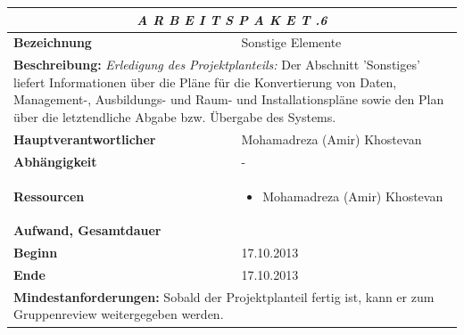 \documentclass[fontsize=12pt,paper=a4,twoside]{scrartcl}
\begin{document}
\begin{tabular}{p{7.5cm}|p{7.5cm}}\toprule
\multicolumn{2}{c}{\textbf{\textit{A R B E I T S P A K E T \quad 1.1.6}}} \\ \toprule \hline
\textbf{Bezeichnung} & Sonstige Elemente\\\hline
\multicolumn{2}{p{15cm}}{\textbf{Beschreibung:} \newline 
\textit{Erledigung des Projektplanteils:} Der Abschnitt 'Sonstiges' liefert Informationen über die Pläne für die Konvertierung von Daten, Management-, Ausbildungs- und Raum- und Installationspläne sowie den Plan über die letztendliche Abgabe bzw. Übergabe des Systems. }  \\\hline
\textbf{Hauptverantwortlicher} & Mohamadreza (Amir) Khostevan \\\hline
\textbf{Abhängigkeit} & -\\\hline
\textbf{Ressourcen} & \begin{itemize} 
\itemsep0pt
\item Mohamadreza (Amir) Khostevan
\end{itemize} \\\hline
\textbf{Aufwand, Gesamtdauer} & \\\hline
\textbf{Beginn} & 17.10.2013 \\\hline
\textbf{Ende} & 17.10.2013\\\hline
\multicolumn{2}{p{15cm}}{\textbf{Mindestanforderungen: } \newline
Sobald der Projektplanteil fertig ist, kann er zum Gruppenreview weitergegeben werden. }  \\ \toprule
\end{tabular} \\\\
\end{document}
